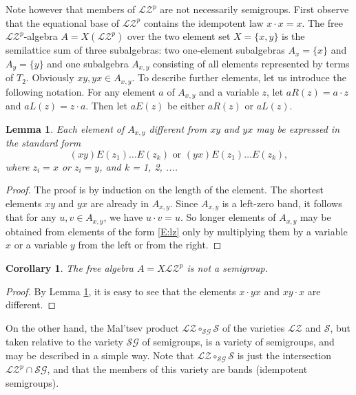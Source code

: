 \documentclass{birkau}
\newcommand{\mc}{\mathcal}
\newcommand{\mcS}{\mathcal{S}}
\newcommand{\pro}[1]{{#1}^p}
\theoremstyle{plain}
\newtheorem{corollary}[theorem]{Corollary}
\newtheorem{lemma}[theorem]{Lemma}
\theoremstyle{definition}
\numberwithin{equation}{section}
\begin{document}
Note however that members of $\pro{\mc{LZ}}$ are not necessarily semigroups. First observe
that the equational base of $\pro{\mc{LZ}}$ contains the idempotent law $x \cdot x =
x$. The free $\pro{\mc{LZ}}$-algebra $A = X(\pro{\mc{LZ}})$ over the two element set
$X = \{x,y\}$ is the semilattice sum of three subalgebras: two one-element subalgebras
$A_x = \{x\}$ and $A_y = \{y\}$ and one subalgebra $A_{x,y}$ consisting of all elements
represented by terms of $T_2$. Obviously $xy, yx \in A_{x,y}$. To describe further
elements, let us introduce the following notation. For any element $a$ of $A_{x,y}$ and a
variable $z$, let $aR(z) = a \cdot z$ and $aL(z) = z \cdot a$. Then let $aE(z)$ be either
$aR(z)$ or $aL(z)$.
\begin{lemma}\label{L:fr}
Each element of $A_{x,y}$ different from $xy$ and $yx$ may be expressed in the standard form
\begin{equation}\label{E:lz}
(xy)E(z_1) \dots E(z_{k}) \,\, \mbox{or} \,\, (yx)E(z_1) \dots E(z_{k}),
\end{equation}
where $z_i = x$ or $z_i = y$, and k = 1, 2, ....
\end{lemma}
\begin{proof}
The proof is by induction on the length of the element. The shortest elements $xy$ and
$yx$ are already in $A_{x,y}$.
Since $A_{x,y}$ is a left-zero band, it follows that for any $u, v \in A_{x,y}$, we have $u \cdot v = u$.
So longer elements of $A_{x,y}$ may be obtained from elements of the form \eqref{E:lz}
only by multiplying them by a variable $x$ or a variable $y$ from the left or from the
right.
\end{proof}

\begin{corollary}\label{C:freePLZ}
The free algebra $A = X\pro{\mc{LZ}}$ is not a semigroup.
\end{corollary}
\begin{proof}
By Lemma \ref{L:fr}, it is easy to see that the elements $x \cdot yx$ and $xy \cdot x$ are different.
\end{proof}

On the other hand, the Mal'tsev product $\mc{LZ} \circ_{\mc{SG}} \mcS$ of the varieties
$\mc{LZ}$ and $\mcS$, but taken relative to the variety $\mc{SG}$ of semigroups, is a
variety of semigroups, and may be described in a simple way. Note that $\mc{LZ}
\circ_{\mc{SG}} \mcS$ is just the intersection $\pro{\mc{LZ}} \cap \mc{SG}$, and that the
members of this variety are bands (idempotent semigroups).
\end{document}
